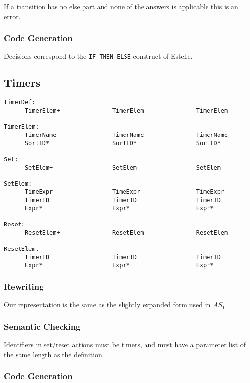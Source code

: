 If a transition has no else part and none of the answers is 
applicable this is an error.

\subsubsection{Code Generation}

Decisions correspond to the {\tt IF-THEN-ELSE} construct of Estelle.

\subsection{Timers}

\begin{verbatim}
TimerDef:
      TimerElem+               TimerElem               TimerElem

TimerElem:
      TimerName                TimerName               TimerName
      SortID*                  SortID*                 SortID*

Set:
      SetElem+                 SetElem                 SetElem

SetElem:
      TimeExpr                 TimeExpr                TimeExpr
      TimerID                  TimerID                 TimerID
      Expr*                    Expr*                   Expr*

Reset:
      ResetElem+               ResetElem               ResetElem

ResetElem:
      TimerID                  TimerID                 TimerID
      Expr*                    Expr*                   Expr*
\end{verbatim}

\subsubsection{Rewriting}

Our representation is the same as the slightly expanded form used in $AS_1$.

\subsubsection{Semantic Checking}

Identifiers in set/reset actions must be timers, and must have a
parameter list of the same length as the definition.

\subsubsection{Code Generation}

